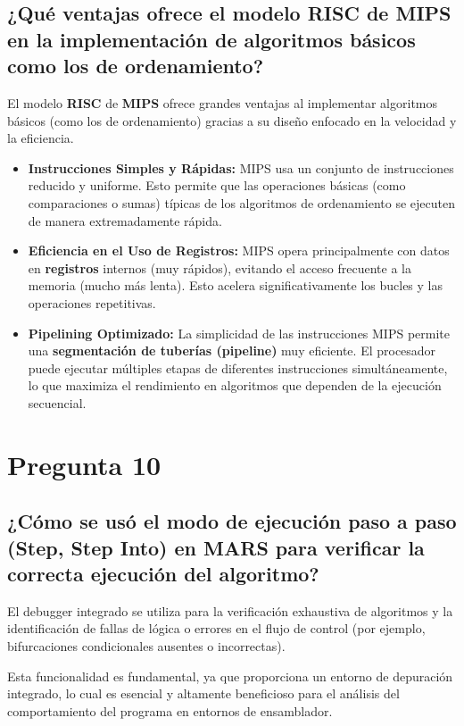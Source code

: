 \documentclass{article}
\begin{document}
\subsection*{¿Qué ventajas ofrece el modelo RISC de MIPS en la implementación de algoritmos básicos como los de ordenamiento?}
El modelo \textbf{RISC} de \textbf{MIPS} ofrece grandes ventajas al implementar algoritmos básicos (como los de ordenamiento) gracias a su diseño enfocado en la velocidad y la eficiencia.

\begin{itemize}
\item \textbf{Instrucciones Simples y Rápidas:} MIPS usa un conjunto de instrucciones reducido y uniforme. Esto permite que las operaciones básicas (como comparaciones o sumas) típicas de los algoritmos de ordenamiento se ejecuten de manera extremadamente rápida.
\item \textbf{Eficiencia en el Uso de Registros:} MIPS opera principalmente con datos en \textbf{registros} internos (muy rápidos), evitando el acceso frecuente a la memoria (mucho más lenta). Esto acelera significativamente los bucles y las operaciones repetitivas.
\item \textbf{Pipelining Optimizado:} La simplicidad de las instrucciones MIPS permite una \textbf{segmentación de tuberías (pipeline)} muy eficiente. El procesador puede ejecutar múltiples etapas de diferentes instrucciones simultáneamente, lo que maximiza el rendimiento en algoritmos que dependen de la ejecución secuencial.
\end{itemize}

\section*{Pregunta 10}
\subsection*{¿Cómo se usó el modo de ejecución paso a paso (Step, Step Into) en MARS para verificar la correcta ejecución del algoritmo?}
El debugger integrado se utiliza para la verificación exhaustiva de algoritmos y la identificación de fallas de lógica o errores en el flujo de control (por ejemplo, bifurcaciones condicionales ausentes o incorrectas).

Esta funcionalidad es fundamental, ya que proporciona un entorno de depuración integrado, lo cual es esencial y altamente beneficioso para el análisis del comportamiento del programa en entornos de ensamblador.
\end{document}
